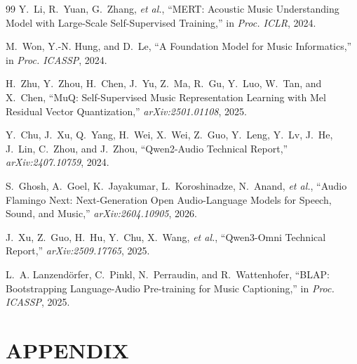\documentclass[9pt]{report}
\begin{document}
\begin{thebibliography}{99}
Y.~Li, R.~Yuan, G.~Zhang, \emph{et al.},
``MERT: Acoustic Music Understanding Model with Large-Scale Self-Supervised Training,'' in
\emph{Proc. ICLR}, 2024.

M.~Won, Y.-N. Hung, and D.~Le,
``A Foundation Model for Music Informatics,'' in \emph{Proc. ICASSP}, 2024.

H.~Zhu, Y.~Zhou, H.~Chen, J.~Yu, Z.~Ma, R.~Gu, Y.~Luo, W.~Tan, and X.~Chen,
``MuQ: Self-Supervised Music Representation Learning with Mel Residual Vector Quantization,''
\emph{arXiv:2501.01108}, 2025.

Y.~Chu, J.~Xu, Q.~Yang, H.~Wei, X.~Wei, Z.~Guo, Y.~Leng, Y.~Lv, J.~He, J.~Lin, C.~Zhou, and
J.~Zhou,
``Qwen2-Audio Technical Report,'' \emph{arXiv:2407.10759}, 2024.

S.~Ghosh, A.~Goel, K.~Jayakumar, L.~Koroshinadze, N.~Anand, \emph{et al.},
``Audio Flamingo Next: Next-Generation Open Audio-Language Models for Speech, Sound, and Music,''
\emph{arXiv:2604.10905}, 2026.

J.~Xu, Z.~Guo, H.~Hu, Y.~Chu, X.~Wang, \emph{et al.},
``Qwen3-Omni Technical Report,'' \emph{arXiv:2509.17765}, 2025.

L.~A. Lanzendörfer, C.~Pinkl, N.~Perraudin, and R.~Wattenhofer,
``BLAP: Bootstrapping Language-Audio Pre-training for Music Captioning,'' in \emph{Proc. ICASSP},
2025.

\end{thebibliography}
\endgroup

\appendix
\chapter{APPENDIX}
\end{document}
